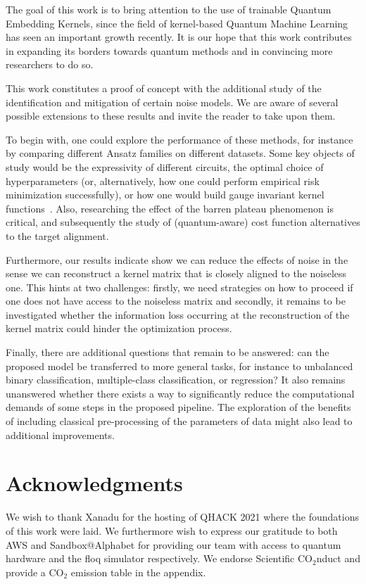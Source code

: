 \documentclass[twocolumn,superscriptaddress,nofootinbib]{revtex4-2}
\begin{document}
    The goal of this work is to bring attention to the use of trainable Quantum Embedding Kernels, since the field of kernel-based Quantum Machine Learning has seen an important growth recently. It is our hope that this work contributes in expanding its borders towards quantum methods and in convincing more researchers to do so.
    
    This work constitutes a proof of concept with the additional study of the identification and mitigation of certain noise models. We are aware of several possible extensions to these results and invite the reader to take upon them.
    
    To begin with, one could explore the performance of these methods, for instance by comparing different Ansatz families on different datasets.
    Some key objects of study would be the expressivity of different circuits, the optimal choice of hyperparameters (or, alternatively, how one could perform empirical risk minimization successfully), or how one would build gauge invariant kernel functions~\cite{Bronstein2017GeometricDeepLearning}.
    Also, researching the effect of the barren plateau phenomenon \cite{mccleanBarrenPlateausQuantum2018a} is critical, and subsequently the study of (quantum-aware) cost function alternatives to the target alignment.
    
    Furthermore, our results indicate show we can reduce the effects of noise in the sense we can reconstruct a kernel matrix that is closely aligned to the noiseless one.
    This hints at two challenges: firstly, we need strategies on how to proceed if one does not have access to the noiseless matrix and secondly, it remains to be investigated whether the information loss occurring at the reconstruction of the kernel matrix could hinder the optimization process.
    
    Finally, there are additional questions that remain to be answered: can the proposed model be transferred to more general tasks, for instance to unbalanced binary classification, multiple-class classification, or regression? It also remains unanswered whether there exists a way to significantly reduce the computational demands of some steps in the proposed pipeline. The exploration of the benefits of including classical pre-processing of the parameters of data might also lead to additional improvements.

\section*{Acknowledgments}
We wish to thank Xanadu for the hosting of QHACK 2021 where the foundations of this work were laid. We furthermore wish to express our gratitude to both AWS and Sandbox@Alphabet for providing our team with access to quantum hardware and the floq simulator respectively.
We endorse Scientific CO$_2$nduct \cite{conduct} and provide a CO$_2$ emission table in the appendix.
\end{document}
